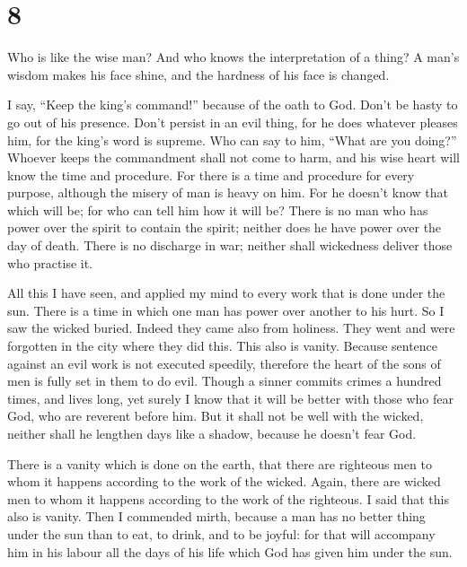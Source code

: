 \hypertarget{section-7}{%
\section{8}\label{section-7}}

 Who is like the wise man? And who knows the interpretation
of a thing? A man's wisdom makes his face shine, and the hardness of his
face is changed.

 I say, ``Keep the king's command!'' because of the oath to
God.  Don't be hasty to go out of his presence. Don't
persist in an evil thing, for he does whatever pleases him, 
for the king's word is supreme. Who can say to him, ``What are you
doing?''  Whoever keeps the commandment shall not come to
harm, and his wise heart will know the time and procedure. 
For there is a time and procedure for every purpose, although the misery
of man is heavy on him.  For he doesn't know that which will
be; for who can tell him how it will be?  There is no man
who has power over the spirit to contain the spirit; neither does he
have power over the day of death. There is no discharge in war; neither
shall wickedness deliver those who practise it.

 All this I have seen, and applied my mind to every work
that is done under the sun. There is a time in which one man has power
over another to his hurt.  So I saw the wicked buried.
Indeed they came also from holiness. They went and were forgotten in the
city where they did this. This also is vanity.  Because
sentence against an evil work is not executed speedily, therefore the
heart of the sons of men is fully set in them to do evil. 
Though a sinner commits crimes a hundred times, and lives long, yet
surely I know that it will be better with those who fear God, who are
reverent before him.  But it shall not be well with the
wicked, neither shall he lengthen days like a shadow, because he doesn't
fear God.

 There is a vanity which is done on the earth, that there
are righteous men to whom it happens according to the work of the
wicked. Again, there are wicked men to whom it happens according to the
work of the righteous. I said that this also is vanity. 
Then I commended mirth, because a man has no better thing under the sun
than to eat, to drink, and to be joyful: for that will accompany him in
his labour all the days of his life which God has given him under the
sun.

